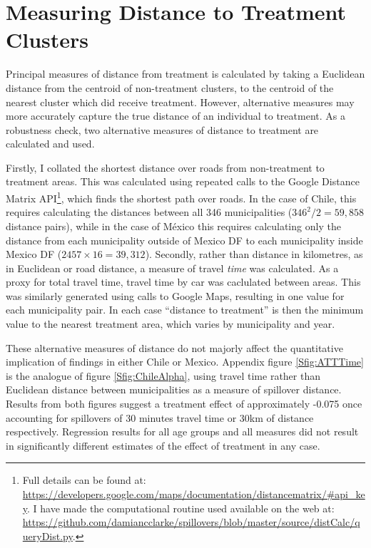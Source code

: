 \section{Measuring Distance to Treatment Clusters}
\label{Sscn:distApp}
Principal measures of distance from treatment is calculated by taking a 
Euclidean distance from the centroid of non-treatment clusters, to the centroid 
of the nearest cluster which did receive treatment. However, alternative 
measures may more accurately capture the true distance of an individual to 
treatment.  As a robustness check, two alternative measures of distance to 
treatment are calculated and used.

Firstly, I collated the shortest distance over roads from non-treatment to 
treatment areas.  This was calculated using repeated calls to the Google 
Distance Matrix API\footnote{Full details can be found at:
\url{https://developers.google.com/maps/documentation/distancematrix/\#api\_key}.
I have made the computational routine used available on the web at:
\url{https://github.com/damiancclarke/spillovers/blob/master/source/distCalc/queryDist.py}.}, 
which finds the shortest path over roads.  In the case of Chile, this requires 
calculating the distances between all 346  municipalities ($346^2/2=59,858$ 
distance pairs), while in the case of M\'exico this requires calculating only 
the distance from each municipality outside of Mexico DF to each municipality 
inside Mexico DF ($2457\times 16=39,312$).  Secondly, rather than distance in 
kilometres, as in Euclidean or road distance, a measure of travel \emph{time} 
was calculated.  As a proxy for total travel time, travel time by car was 
caclulated between areas.  This was similarly generated using calls to Google 
Maps, resulting in one value for each municipality pair.  In each case 
``distance to treatment'' is then the minimum value to the nearest treatment 
area, which varies by municipality and year.

These alternative measures of distance do not majorly affect the quantitative 
implication of findings in either Chile or Mexico.  Appendix figure 
\ref{Sfig:ATTTime} is the analogue of figure \ref{Sfig:ChileAlpha},
using travel time rather than Euclidean distance between municipalities as
a measure of spillover distance.  Results from both figures suggest a 
treatment effect of approximately -0.075 once accounting for spillovers of
30 minutes travel time or 30km of distance respectively.  Regression results
for all age groups and all measures did not result in significantly different
estimates of the effect of treatment in any case.

